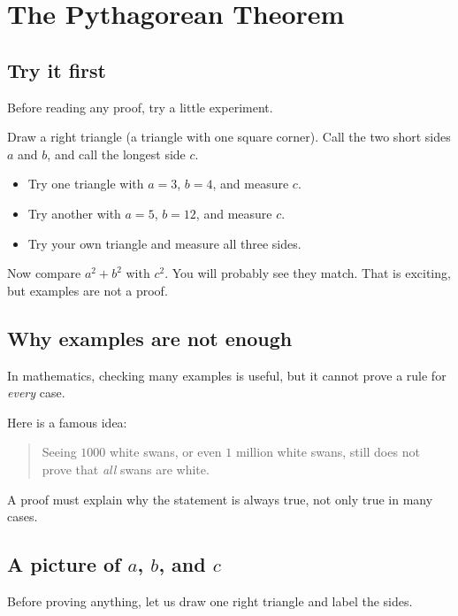 \chapter{The Pythagorean Theorem}

\section{Try it first}
Before reading any proof, try a little experiment.

Draw a right triangle (a triangle with one square corner). Call the two short
sides \(a\) and \(b\), and call the longest side \(c\).

\begin{itemize}
  \item Try one triangle with \(a=3\), \(b=4\), and measure \(c\).
  \item Try another with \(a=5\), \(b=12\), and measure \(c\).
  \item Try your own triangle and measure all three sides.
\end{itemize}

Now compare \(a^2+b^2\) with \(c^2\). You will probably see they match.
That is exciting, but examples are not a proof.

\section{Why examples are not enough}
In mathematics, checking many examples is useful, but it cannot prove a rule
for \emph{every} case.

Here is a famous idea:
\begin{quote}
Seeing \(1000\) white swans, or even \(1\) million white swans, still does not
prove that \emph{all} swans are white.
\end{quote}

A proof must explain why the statement is always true, not only true in many
cases.

\section{A picture of \(a\), \(b\), and \(c\)}
Before proving anything, let us draw one right triangle and label the sides.

\begin{center}
\end{center}

